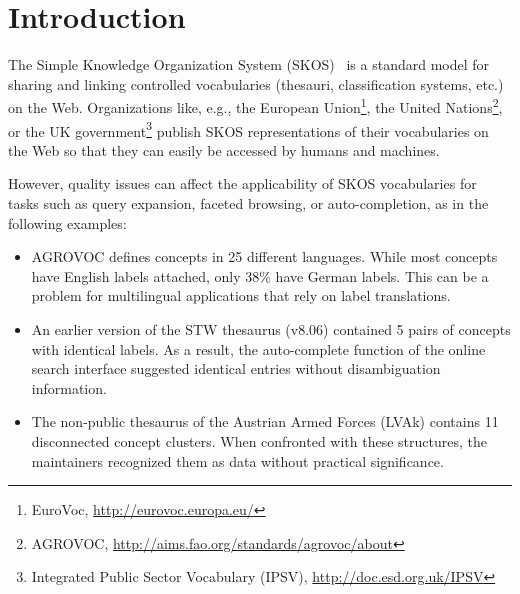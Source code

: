 
\section{Introduction}\label{sec:introduction}


The Simple Knowledge Organization System (SKOS)~\cite{SkosReference2008} is a standard model for sharing and linking controlled vocabularies (thesauri, classification systems, etc.) on the Web. Organizations like, e.g., the European Union\footnote{EuroVoc, \url{http://eurovoc.europa.eu/}}, the United Nations\footnote{AGROVOC, \url{http://aims.fao.org/standards/agrovoc/about}}, or the UK government\footnote{Integrated Public Sector Vocabulary (IPSV), \url{http://doc.esd.org.uk/IPSV}} publish SKOS representations of their vocabularies on the Web so that they can easily be accessed by humans and machines.

However, quality issues can affect the applicability of SKOS vocabularies for tasks such as query expansion, faceted browsing, or auto-completion, as in the following examples: 

\begin{itemize}

	\item AGROVOC defines concepts in 25 different languages. While most concepts have English labels attached, only 38\% have German labels. This can be a problem for multilingual applications that rely on label translations.

	\item An earlier version of the STW thesaurus (v8.06) contained 5 pairs of concepts with identical labels. As a result, the auto-complete function of the online search interface suggested identical entries without disambiguation information.

	\item The non-public thesaurus of the Austrian Armed Forces (LVAk) contains 11 disconnected concept clusters. When confronted with these structures, the maintainers recognized them as data without practical significance.
	
\end{itemize}


